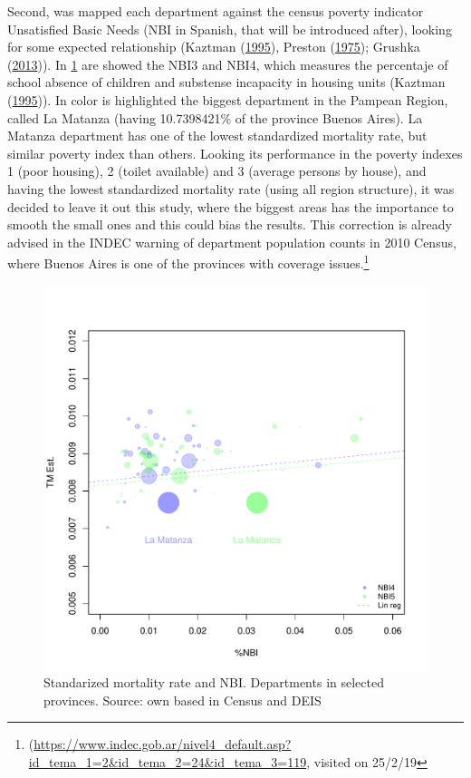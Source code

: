 \documentclass[12pt,]{article}
\begin{document}
Second, was mapped each department against the census poverty indicator
Unsatisfied Basic Needs (NBI in Spanish, that will be introduced after),
looking for some expected relationship (Kaztman
(\protect\hyperlink{ref-Kaztman1995}{1995}), Preston
(\protect\hyperlink{ref-Preston_1975}{1975}); Grushka
(\protect\hyperlink{ref-Grushka2013}{2013})). In \ref{fig:NBI} are
showed the NBI3 and NBI4, which measures the percentaje of school
absence of children and substense incapacity in housing units (Kaztman
(\protect\hyperlink{ref-Kaztman1995}{1995})). In color is highlighted
the biggest department in the Pampean Region, called La Matanza (having
10.7398421\% of the province Buenos Aires). La Matanza department has
one of the lowest standardized mortality rate, but similar poverty index
than others. Looking its performance in the poverty indexes 1 (poor
housing), 2 (toilet available) and 3 (average persons by house), and
having the lowest standardized mortality rate (using all region
structure), it was decided to leave it out this study, where the biggest
areas has the importance to smooth the small ones and this could bias
the results. This correction is already advised in the INDEC warning of
department population counts in 2010 Census, where Buenos Aires is one
of the provinces with coverage issues.\footnote{(\url{https://www.indec.gob.ar/nivel4_default.asp?id_tema_1=2\&id_tema_2=24\&id_tema_3=119},
  visited on 25/2/19}

\begin{figure}

{\centering \includegraphics[width=0.7\linewidth]{plots/ChekNBI} 

}

\caption{Standarized mortality rate and NBI. Departments in selected provinces. Source: own based in Census and DEIS}\label{fig:NBI}
\end{figure}
\end{document}
